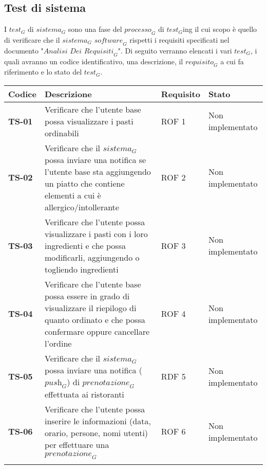 \subsection{Test di sistema}
I $\textit{test}_G$ di $\textit{sistema}_G$ sono una fase del $\textit{processo}_G$ di $\textit{test}_G$ing il cui scopo è quello di verificare che il $\textit{sistema}_G$ $\textit{software}_G$ rispetti i requisiti specificati nel documento "$\textit{Analisi Dei Requisiti}_G$".
Di seguito verranno elencati i vari $\textit{test}_G$, i quali avranno un codice identificativo, una descrizione, il $\textit{requisito}_G$ a cui fa riferimento e lo stato del $\textit{test}_G$.
    \begin{longtable}{|>{\centering\arraybackslash}p{1.5cm}|p{9.8cm}|p{2cm}|p{3.5cm}|}
    \hline
    \rowcolor{gray!30}
    \textbf{Codice} & \textbf{Descrizione} & \textbf{Requisito} & \textbf{Stato} \\
    \hline
    \rowcolor{gray!10}
    \textbf{TS-01} & Verificare che l'utente base possa visualizzare i pasti ordinabili & ROF 1 & Non implementato \\
    \hline
    \rowcolor{gray!10}
    \textbf{TS-02} & Verificare che il $\textit{sistema}_G$ possa inviare una notifica se l'utente base sta aggiungendo un piatto che contiene elementi a cui è allergico/intollerante & ROF 2 & Non implementato \\ 
    \hline 
    \rowcolor{gray!10}
    \textbf{TS-03} & Verificare che l'utente possa visualizzare i pasti con i loro ingredienti e che possa modificarli, aggiungendo o togliendo ingredienti & ROF 3 & Non implementato \\ 
    \hline
    \rowcolor{gray!10}
    \textbf{TS-04} & Verificare che l'utente base possa essere in grado di visualizzare il riepilogo di quanto ordinato e che possa confermare oppure cancellare l'ordine & ROF 4 & Non implementato \\ 
    \hline
    \rowcolor{gray!10}
    \textbf{TS-05} & Verificare che il $\textit{sistema}_G$ possa inviare una notifica ($\textit{push}_G$) di $\textit{prenotazione}_G$ effettuata ai ristoranti & RDF 5 & Non implementato \\ 
    \hline
    \rowcolor{gray!10}
    \textbf{TS-06} & Verificare che l'utente possa inserire le informazioni (data, orario, persone, nomi utenti) per effettuare una $\textit{prenotazione}_G$ & ROF 6 & Non implementato \\
    \hline
    \rowcolor{gray!10}

\end{longtable}

